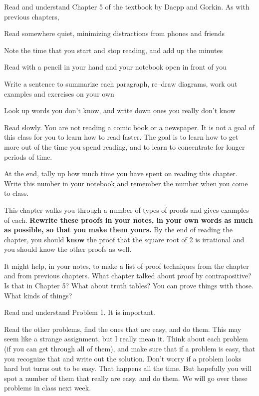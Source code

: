 
Read and understand Chapter 5 of the textbook by Daepp and Gorkin.
As with previous chapters,
{\small
\blist{0.0in}
\item Read somewhere quiet, minimizing distractions from phones and friends
\item Note the time that you start and stop reading, and add up the minutes
\item Read with a pencil in your hand and your notebook open in front of you
\item Write a sentence to summarize each paragraph, re--draw diagrams, work out examples and exercises on your own
\item Look up words you don't know, and write down ones you really don't know
\item Read slowly.  You are not reading a comic book or a newspaper.  It is not a goal of this class for you to learn how to read faster.  The goal is to learn how to get more out of the time you spend reading, and to learn to concentrate for longer periods of time.
\item At the end, tally up how much time you have spent on reading this chapter.
Write this number in your notebook and remember the number when you come to class.
\elist
}

This chapter walks you through a number of types of proofs and gives examples of each.  {\bf Rewrite these proofs in your notes, in your own words as much as possible, so that you make them yours.}  By the end of reading the chapter, you should {\bf know} the proof that the square root of 2 is irrational and you should know the other proofs as well.

It might help, in your notes, to make a list of proof techniques from the chapter and from previous chapters.
What chapter talked about proof by contrapositive?  Is that in Chapter 5?
What about truth tables?  You can prove things with those.  What kinds of things?

Read and understand Problem 1.  It is important.

Read the other problems, find the ones that are easy, and do them.
This may seem like a strange assignment, but I really mean it.  Think about each problem (if you can get through all of them), and make sure that if a problem is easy, that you recognize that and write out the solution.
Don't worry if a problem looks hard but turns out to be easy.
That happens all the time.
But hopefully you will spot a number of them that really are easy, and do them.
We will go over these problems in class next week.

\vfill          %

